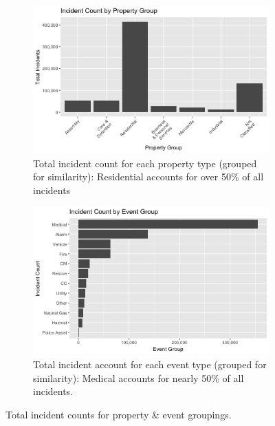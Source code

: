 \documentclass[12pt,letterpaper, oneside]
{article}
\begin{document}
\begin{figure}
	\centering
	\begin{subfigure}[b]{\textwidth}
		\includegraphics[width=\textwidth]{incident-count-by-property-group}
		\caption{
			Total incident count for each property type (grouped for similarity): Residential accounts for over 50\% of all incidents
			\label{fig:cnt-prop}
		}
	\end{subfigure}
	\begin{subfigure}[b]{\textwidth}
		\includegraphics[width=\textwidth]{incident_count_by_event_group}
		\caption{
			Total incident account for each event type (grouped for similarity): Medical accounts for nearly 50\% of all incidents.
			\label{fig:cnt-event}
		}
	\end{subfigure}
	\caption{Total incident counts for property \& event groupings.
		\label{fig:prop-event}
	}
\end{figure}
\end{document}
